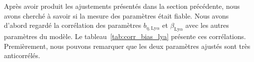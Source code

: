 Après avoir produit les ajustements présentés dans la section précédente, nous avons cherché à savoir si la mesure des paramètres \lya{} était fiable. Nous avons d'abord regardé la corrélation des paramètres $b_{\eta,\mathrm{Ly}\alpha}$ et $\beta_{\mathrm{Ly}\alpha}$ avec les autres paramètres du modèle. Le tableau~\ref{tab:corr_bias_lya} présente ces corrélations.
Premièrement, nous pouvons remarquer que les deux paramètres \lya{} ajustés sont très anticorrélés.
